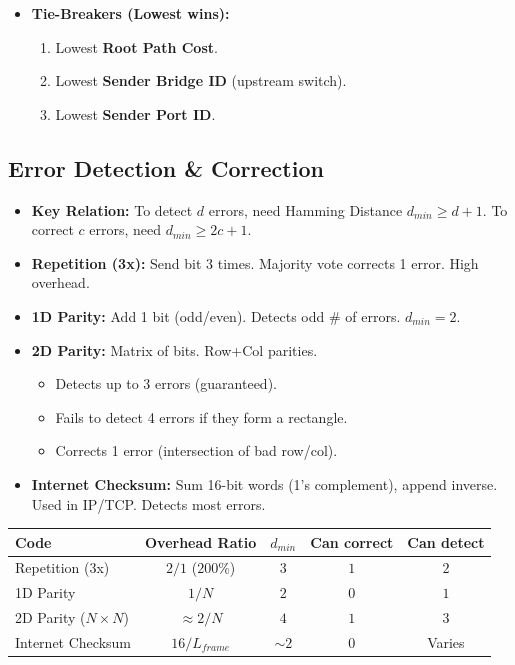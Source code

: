\begin{itemize}
\begin{itemize}
\begin{itemize}
            \item \textbf{4. Block Others:} All non-RP and non-DP ports enter \textbf{Blocking} state (receive BPDUs, but drop data).
        \end{itemize}
        \item \textbf{Tie-Breakers (Lowest wins):}
        \begin{enumerate}
            \item Lowest \textbf{Root Path Cost}.
            \item Lowest \textbf{Sender Bridge ID} (upstream switch).
            \item Lowest \textbf{Sender Port ID}.
        \end{enumerate}
    \end{itemize}
\end{itemize}

\subsection{Error Detection \& Correction}
\begin{itemize}
    \item \textbf{Key Relation:} To detect $d$ errors, need Hamming Distance $d_{min} \ge d+1$. To correct $c$ errors, need $d_{min} \ge 2c+1$.
    \item \textbf{Repetition (3x):} Send bit 3 times. Majority vote corrects 1 error. High overhead.
    \item \textbf{1D Parity:} Add 1 bit (odd/even). Detects odd \# of errors. $d_{min}=2$.
    \item \textbf{2D Parity:} Matrix of bits. Row+Col parities.
    \begin{itemize}
        \item Detects up to 3 errors (guaranteed).
        \item Fails to detect 4 errors if they form a rectangle.
        \item Corrects 1 error (intersection of bad row/col).
    \end{itemize}
    \item \textbf{Internet Checksum:} Sum 16-bit words (1's complement), append inverse. Used in IP/TCP. Detects most errors.
\end{itemize}

\begin{center}
\renewcommand{\arraystretch}{1.2}
\setlength{\tabcolsep}{4pt}
\begin{tabular}{l|c|c|c|c}
\textbf{Code} & \textbf{Overhead Ratio} & \textbf{$d_{min}$} & \textbf{Can correct} & \textbf{Can detect} \\
\hline
Repetition (3x) & $2/1$ ($200\%$) & $3$ & $1$ & $2$ \\
1D Parity & $1/N$ & $2$ & $0$ & $1$ \\
2D Parity ($N \times N$) & $\approx 2/N$ & $4$ & $1$ & $3$ \\
Internet Checksum & $16/L_{frame}$ & $\sim 2$ & $0$ & Varies \\
\end{tabular}
\end{center}

